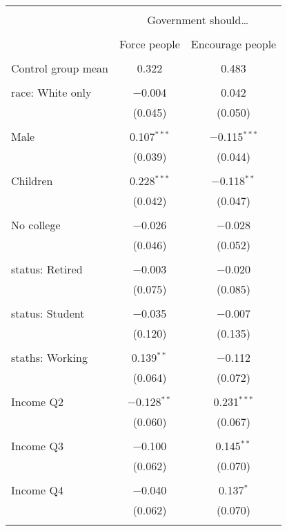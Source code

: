 
\begin{tabular}{@{\extracolsep{5pt}}lcc} 
\\[-1.8ex]\hline 
\hline \\[-1.8ex] 
 & \multicolumn{2}{c}{Government should…} \\ 
\cline{2-3} 
\\[-1.8ex] & Force people & Encourage people \\ 
\hline \\[-1.8ex] 
 Control group mean & 0.322 & 0.483  \\ \hline \\[-1.8ex] race: White only & $-$0.004 & 0.042 \\ 
  & (0.045) & (0.050) \\ 
  & & \\ 
 Male & 0.107$^{***}$ & $-$0.115$^{***}$ \\ 
  & (0.039) & (0.044) \\ 
  & & \\ 
 Children & 0.228$^{***}$ & $-$0.118$^{**}$ \\ 
  & (0.042) & (0.047) \\ 
  & & \\ 
 No college & $-$0.026 & $-$0.028 \\ 
  & (0.046) & (0.052) \\ 
  & & \\ 
 status: Retired & $-$0.003 & $-$0.020 \\ 
  & (0.075) & (0.085) \\ 
  & & \\ 
 status: Student & $-$0.035 & $-$0.007 \\ 
  & (0.120) & (0.135) \\ 
  & & \\ 
 staths: Working & 0.139$^{**}$ & $-$0.112 \\ 
  & (0.064) & (0.072) \\ 
  & & \\ 
 Income Q2 & $-$0.128$^{**}$ & 0.231$^{***}$ \\ 
  & (0.060) & (0.067) \\ 
  & & \\ 
 Income Q3 & $-$0.100 & 0.145$^{**}$ \\ 
  & (0.062) & (0.070) \\ 
  & & \\ 
 Income Q4 & $-$0.040 & 0.137$^{*}$ \\ 
  & (0.062) & (0.070) \\ 
  & & \\ 

\end{tabular}
